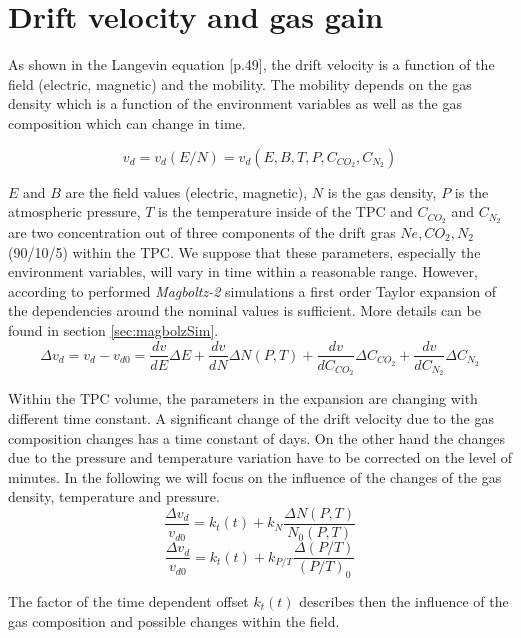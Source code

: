 \documentclass{elsart}
\begin{document}
\section{Drift velocity and gas gain}

As shown in the Langevin equation \cite{blum}[p.49], the drift velocity is a function of the field (electric, magnetic) and the mobility. The mobility depends on the gas density which is a function of the environment variables as well as the gas composition which can change in time. 

$$v_d = v_d(E/N) = v_d(E,B,T,P,C_{CO_2},C_{N_2})$$

$E$ and $B$ are the field values (electric, magnetic), $N$ is the gas density, $P$ is the atmospheric pressure, $T$ is the temperature inside of the TPC and $C_{CO_2}$ and $C_{N_2}$ are two concentration out of three components of the drift gras $Ne,CO_2,N_2$ (90/10/5) within the TPC. We suppose that these parameters, especially the environment variables, will vary in time within a reasonable range. However, according to performed \textsl{Magboltz-2} \cite{magboltz} simulations a first order Taylor expansion of the dependencies around the nominal values is sufficient. More details can be found in section \ref{sec:magbolzSim}.
\begin{equation}
\Delta{v_d}=v_d-v_{d0}=\frac{dv}{dE}\Delta{E}+\frac{dv}{dN}\Delta{N(P,T)}+\frac{dv}{dC_{CO_2}}\Delta{C_{CO_2}}+\frac{dv}{dC_{N_2}}\Delta{C_{N_2}}
\label{equ:taylor}
\end{equation}

Within the TPC volume, the parameters in the expansion are changing with different time constant. A significant change of the drift velocity due to the gas composition changes has a time constant of days. On the other hand the changes due to the pressure and temperature variation have to be corrected on the level of minutes.
In the following we will focus on the influence of the changes of the gas density, temperature and pressure. 
\begin{equation}
\frac{\Delta{v_d}}{v_{d0}}= k_t(t)+k_{N}\frac{\Delta{N(P,T)}}{N_0(P,T)} 
\end{equation}
\begin{equation}
\frac{\Delta{v_d}}{v_{d0}}= k_t(t)+k_{P/T}\frac{\Delta{(P/T)}}{(P/T)_0} 
\end{equation}

The factor of the time dependent offset $k_t(t)$ describes then the influence of the gas composition and possible changes within the field. 
\end{document}
